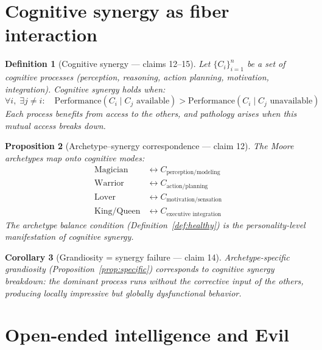 \documentclass[11pt,a4paper]{article}
\newtheorem{definition}{Definition}[section]
\newtheorem{proposition}[definition]{Proposition}
\newtheorem{corollary}[definition]{Corollary}
\begin{document}
\section{Cognitive synergy as fiber interaction}
\label{sec:synergy}

\begin{definition}[Cognitive synergy --- claims 12--15]
\label{def:synergy}
Let $\{C_i\}_{i=1}^n$ be a set of cognitive processes (perception,
reasoning, action planning, motivation, integration). \emph{Cognitive
synergy} holds when:
\[
  \forall i,\; \exists j \neq i: \quad
  \text{Performance}(C_i \mid C_j \text{ available})
  > \text{Performance}(C_i \mid C_j \text{ unavailable})
\]
Each process benefits from access to the others, and pathology arises
when this mutual access breaks down.
\end{definition}

\begin{proposition}[Archetype--synergy correspondence --- claim 12]
\label{prop:correspondence}
The Moore archetypes map onto cognitive modes:
\[
\begin{aligned}
  \text{Magician} &\leftrightarrow C_{\text{perception/modeling}} \\
  \text{Warrior}  &\leftrightarrow C_{\text{action/planning}} \\
  \text{Lover}    &\leftrightarrow C_{\text{motivation/sensation}} \\
  \text{King/Queen} &\leftrightarrow C_{\text{executive integration}}
\end{aligned}
\]
The archetype balance condition (Definition~\ref{def:healthy}) is the
personality-level manifestation of cognitive synergy.
\end{proposition}

\begin{corollary}[Grandiosity = synergy failure --- claim 14]
Archetype-specific grandiosity (Proposition~\ref{prop:specific}) corresponds
to cognitive synergy breakdown: the dominant process runs without the
corrective input of the others, producing locally impressive but globally
dysfunctional behavior.
\end{corollary}

\section{Open-ended intelligence and Evil}
\label{sec:oei}
\end{document}
